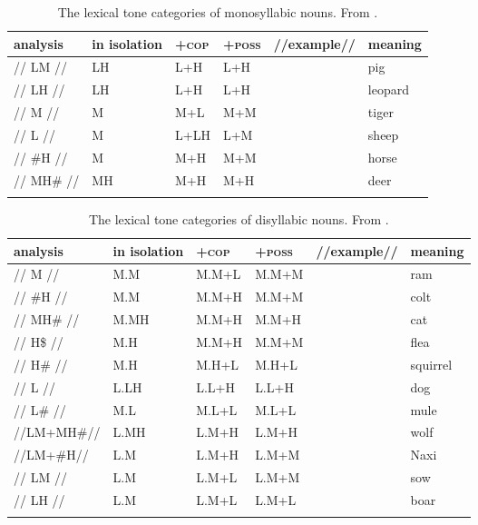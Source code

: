 \begin{refsection}
\begin{subtables}
	\label{tab:thelexicaltonesofmonosyllabicanddisyllabicnounsBIS}
	\begin{table}[h]
		\caption{\label{tab:thelexicaltonesofmonosyllabicnounsBIS}The lexical tone categories of monosyllabic nouns. From .}
		\begin{tabularx}{\textwidth}{ P{20mm} P{19mm} Q Q P{19mm} Q }
			\lsptoprule
			analysis & in isolation & +\textsc{cop} & +\textsc{poss} & //example// & meaning\\ \midrule
			// LM // & LH & L+H & L+H &   & pig\\
			// LH // & LH & L+H & L+H &   & leopard\\
			// M // & M & M+L & M+M &  & tiger\\
			// L // & M & L+LH & L+M &  & sheep\\
			// \#H // & M & M+H & M+M &  & horse\\
			// MH\# // & MH & M+H & M+H &  & deer\\
			\lspbottomrule
		\end{tabularx}
	\end{table}

	
	\begin{table}[t]
		\caption{\label{tab:thelexicaltonesofdisyllabicnounsBIS}The lexical tone categories of disyllabic nouns. From .}
		\begin{tabularx}{\textwidth}{ P{21mm} l Q Q P{19mm} Q }
			\lsptoprule
			analysis & in isolation & +\textsc{cop} & +\textsc{poss} & //example// & meaning\\ \midrule
			// M // & M.M & M.M+L & M.M+M &  & ram\\
			// \#H // & M.M & M.M+H & M.M+M &  & colt\\
			// MH\# // & M.MH & M.M+H & M.M+H &  & cat\\
			// H\$ // & M.H & M.M+H & M.M+M &  & flea\\
			// H\# // & M.H & M.H+L & M.H+L &  & squirrel\\
			// L // & L.LH & L.L+H & L.L+H &  & dog\\
			// L\# // & M.L & M.L+L & M.L+L &  & mule\\
			//LM+MH\#// & L.MH & L.M+H & L.M+H &  & wolf\\
			//LM+\#H// & L.M & L.M+H & L.M+M &  & Naxi\\
			// LM // & L.M & L.M+L & L.M+M &  & sow\\
			// LH // & L.M & L.M+L & L.M+L &  & boar\\
			\lspbottomrule
		\end{tabularx}
	\end{table}
\end{subtables}



\end{refsection}
